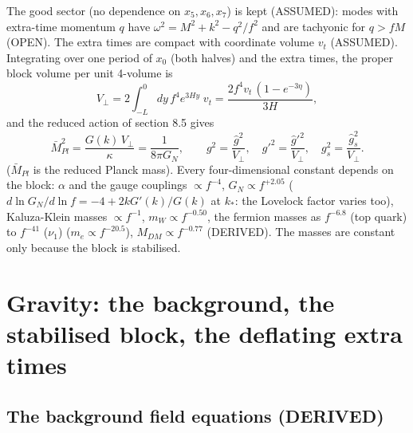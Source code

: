 \documentclass[
  10pt,
]{article}
\begin{document}
The good sector (no dependence on \(x_5, x_6, x_7\)) is kept (ASSUMED):
modes with extra-time momentum \(q\) have
\(\omega^2 = M^2 + k^2 - q^2/f^2\) and are tachyonic for \(q > fM\)
(OPEN). The extra times are compact with coordinate volume \(v_t\)
(ASSUMED). Integrating over one period of \(x_0\) (both halves) and the
extra times, the proper block volume per unit 4-volume is
\[ V_\perp = 2\int_{-L}^{0}dy\,f^4e^{3Hy}\;v_t = \frac{2f^4v_t\,(1 - e^{-3\eta})}{3H}, \]
and the reduced action of section 8.5 gives
\[ \bar M_{Pl}^2 = \frac{G(k)\,V_\perp}{\kappa} = \frac{1}{8\pi G_N},\qquad g^2 = \frac{\hat g^2}{V_\perp},\quad
   g'^2 = \frac{\hat g'^2}{V_\perp},\quad g_s^2 = \frac{\hat g_s^2}{V_\perp}. \]
(\(\bar M_{Pl}\) is the reduced Planck mass). Every four-dimensional
constant depends on the block: \(\alpha\) and the gauge couplings
\(\propto f^{-4}\), \(G_N \propto f^{+2.05}\)
(\(d\ln G_N/d\ln f = -4 + 2kG'(k)/G(k)\) at \(k_*\): the Lovelock factor
varies too), Kaluza-Klein masses \(\propto f^{-1}\),
\(m_W \propto f^{-0.50}\), the fermion masses as \(f^{-6.8}\) (top
quark) to \(f^{-41}\) (\(\nu_1\)) (\(m_e \propto f^{-20.5}\)),
\(M_{DM} \propto f^{-0.77}\) (DERIVED). The masses are constant only
because the block is stabilised.

\hypertarget{gravity-the-background-the-stabilised-block-the-deflating-extra-times}{%
\section{Gravity: the background, the stabilised block, the deflating
extra
times}\label{gravity-the-background-the-stabilised-block-the-deflating-extra-times}}

\hypertarget{the-background-field-equations-derived}{%
\subsection{The background field equations
(DERIVED)}\label{the-background-field-equations-derived}}
\end{document}
